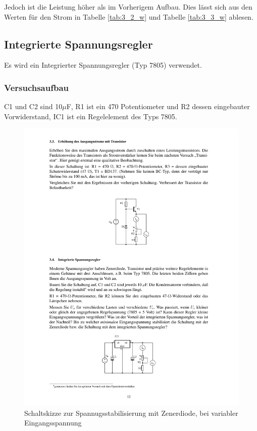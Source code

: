 \documentclass[12pt,a4paper]{article}
\begin{document}
Jedoch ist die Leistung höher als im Vorherigem Aufbau. Dies lässt sich aus den Werten für den Strom in Tabelle \ref{tab:3_2_w} und Tabelle \ref{tab:3_3_w} ablesen.

\subsection{Integrierte Spannungsregler}
Es wird ein Integrierter Spannungsregler (Typ 7805) verwendet.
\subsubsection{Versuchsaufbau}

C1 und C2 sind 10$\mu$F, R1 ist ein 470 Potentiometer und R2 dessen eingebauter Vorwiderstand, IC1 ist ein Regelelement des Typs 7805.

\begin{figure}[H] 
  \centering
    \includegraphics[trim = 10mm 30mm 10mm 205mm, clip, scale = 1]{ep2_14[Page12].pdf}
  	\caption[Schaltskizze zur Spannugsstabilisierung mit Zenerdiode, bei variabler Eingangsspannung]{Schaltskizze zur Spannugsstabilisierung mit Zenerdiode, bei variabler Eingangsspannung\footnotemark}
  \label{fig:2_11}
\end{figure}
\end{document}
